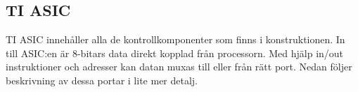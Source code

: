 \documentclass[main.tex]{subfiles}
\begin{document}
\subsection{TI ASIC}
TI ASIC innehåller alla de kontrollkomponenter som finns i konstruktionen. In
till ASIC:en är 8-bitars data direkt kopplad från processorn. Med hjälp in/out
instruktioner och adresser kan datan muxas till eller från rätt port. Nedan
följer beskrivning av dessa portar i lite mer detalj.



\end{document}
